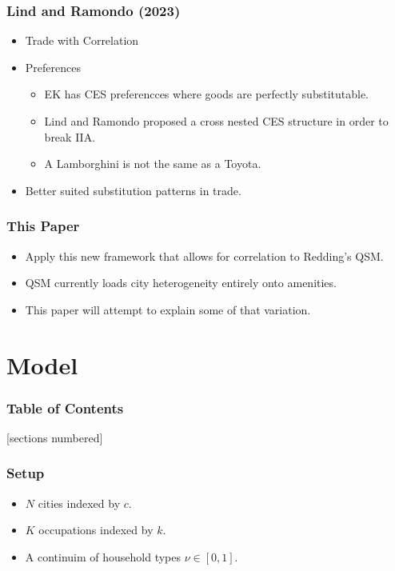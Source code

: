 \documentclass[serif, 9pt, aspectratio=32]{beamer}
\begin{document}
\begin{frame}
    \centering
    \frametitle{Lind and Ramondo (2023)}
    \begin{itemize}
        \setlength{\itemsep}{3em}
        \item Trade with Correlation
        \item Preferences
              \begin{itemize}
                  \setlength{\itemsep}{1em}
                  \item EK has CES preferencces where goods are perfectly substitutable.
                  \item Lind and Ramondo proposed a cross nested CES structure in order to break IIA.
                  \item A Lamborghini is not the same as a Toyota.
              \end{itemize}
        \item Better suited substitution patterns in trade.
    \end{itemize}
\end{frame}

\begin{frame}
    \centering
    \frametitle{This Paper}
    \begin{itemize}
        \setlength{\itemsep}{3em}
        \item Apply this new framework that allows for correlation to Redding's QSM.
        \item QSM currently loads city heterogeneity entirely onto amenities.
        \item This paper will attempt to explain some of that variation.
    \end{itemize}
\end{frame}

\section{Model}

\begin{frame}
    \frametitle{Table of Contents}
    [sections numbered]
    \tableofcontents[currentsection]
\end{frame}

\begin{frame}
    \centering
    \frametitle{Setup}
    \begin{itemize}
        \setlength{\itemsep}{3em}
        \item $N$ cities indexed by $c$.
        \item $K$ occupations indexed by $k$.
        \item A continuim of household types $\nu \in [0,1]$.
    \end{itemize}
\end{frame}
\end{document}
